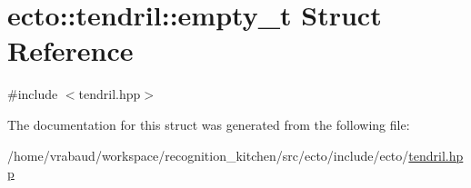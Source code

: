 \hypertarget{structecto_1_1tendril_1_1empty__t}{}\section{ecto\+:\+:tendril\+:\+:empty\+\_\+t Struct Reference}
\label{structecto_1_1tendril_1_1empty__t}


{\ttfamily \#include $<$tendril.\+hpp$>$}



The documentation for this struct was generated from the following file\+:\begin{DoxyCompactItemize}
\item 
/home/vrabaud/workspace/recognition\+\_\+kitchen/src/ecto/include/ecto/\hyperlink{tendril_8hpp}{tendril.\+hpp}\end{DoxyCompactItemize}
